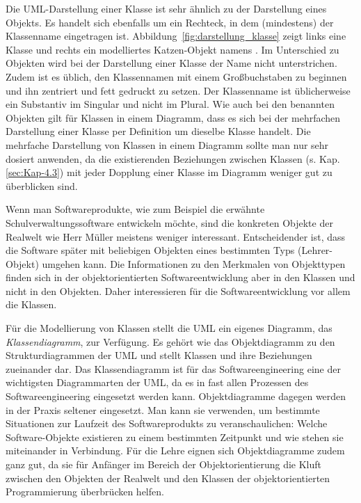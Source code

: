\vspace{\baselineskip} %

Die UML-Darstellung einer Klasse ist sehr ähnlich zu der Darstellung eines Objekts. Es handelt sich ebenfalls um ein Rechteck, in dem (mindestens) der Klassenname eingetragen ist. Abbildung~\ref{fig:darstellung_klasse} zeigt links eine Klasse  und rechts ein modelliertes Katzen-Objekt namens . Im Unterschied zu Objekten wird bei der Darstellung einer Klasse der Name nicht unterstrichen. Zudem ist es üblich, den Klassennamen mit einem Großbuchstaben zu beginnen und ihn zentriert und fett gedruckt zu setzen. Der Klassenname ist üblicherweise ein Substantiv im Singular und nicht im Plural. Wie auch bei den benannten Objekten gilt für Klassen in einem Diagramm, dass es sich bei der mehrfachen Darstellung einer Klasse per Defi\-ni\-tion um dieselbe Klasse handelt. Die mehrfache Darstellung von Klassen in einem Diagramm sollte man nur sehr dosiert anwenden, da die existierenden Beziehungen zwischen Klassen (s. Kap. \ref{sec:Kap-4.3}) mit jeder Dopplung einer Klasse im Diagramm weniger gut zu überblicken sind.

Wenn man Softwareprodukte, wie zum Beispiel die erwähnte Schulverwaltungssoftware entwickeln möchte, sind die konkreten Objekte der Realwelt wie Herr Müller meistens weniger interessant. Entscheidender ist, dass die Software später mit beliebigen Objekten eines bestimmten Typs (\zb Lehrer-Objekt) umgehen kann. Die Informationen zu den Merkmalen von Objekttypen finden sich in der objektorientierten Softwareentwicklung aber in den Klassen und nicht in den Objekten. Daher interessieren für die Softwareentwicklung vor allem die Klassen.

Für die Modellierung von Klassen stellt die UML ein eigenes Diagramm, das \textit{Klassen\-diagramm},
zur Verfügung.  Es gehört wie das Objektdiagramm zu den Struktur\-diagrammen der UML und stellt Klassen und ihre Beziehungen zueinander dar. Das Klassendiagramm ist für das Softwareengineering eine der wichtigsten Diagramm\-arten der UML, da es in fast allen Prozessen des Softwareengineering eingesetzt werden kann. Objektdiagramme dagegen werden in der Praxis seltener eingesetzt. Man kann sie verwenden, um bestimmte Situationen zur Laufzeit des Software\-produkts zu veranschaulichen: Welche Software-Objekte existieren zu einem bestimmten Zeitpunkt und wie stehen sie miteinander in Verbindung. Für die Lehre eignen sich Objekt\-diagramme zudem ganz gut, da sie für Anfänger im Bereich der Objektorientierung die Kluft zwischen den Objekten der Realwelt und den Klassen der objektorientierten Programmierung überbrücken helfen.